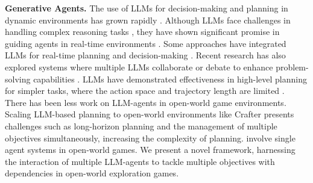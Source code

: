 
\fi

\textbf{Generative Agents. }The use of LLMs for decision-making and planning in dynamic environments has grown rapidly \cite{yang2023foundation, wang2024survey, xi2023rise, sumers2023cognitive}. Although LLMs face challenges in handling complex reasoning tasks \cite{bubeck2023sparks}, they have shown significant promise in guiding agents in real-time environments \cite{park2023generative, sharma2021skill, raman2024cape, pallagani2022plansformer, gramopadhye2023generating, yuan2023distilling, li2022pre, wang2023describe}. Some approaches have integrated LLMs for real-time planning and decision-making \cite{li2023behavior, padmakumar2022teach, kolve2017ai2, shridhar2020alfred, misra2018mapping, zhu2017visual, brodeur2017home, xia2018gibson, savva2019habitat, huang2022language}. %
Recent research has also explored %
systems where multiple LLMs collaborate or debate to enhance problem-solving capabilities \cite{li2023camel, du2023improving, wang2023unleashing}.
LLMs have demonstrated effectiveness in high-level planning for simpler tasks, where the action space and trajectory length are limited \cite{huang2022language, ahn2022can}.
There has been less work on LLM-agents in open-world game environments.
Scaling LLM-based planning to open-world environments \cite{du2023improving, wang2023unleashing} like Crafter presents challenges such as long-horizon planning and the management of multiple objectives simultaneously, increasing the complexity of planning. 
\cite{wu2024spring, li2024optimus, wang2023voyager} involve single agent systems in open-world games. We present a novel framework, harnessing the interaction of multiple LLM-agents to tackle multiple objectives with dependencies in open-world exploration games.

